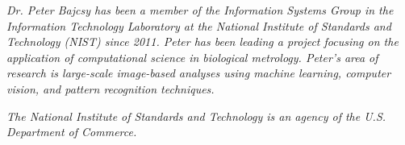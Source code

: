 \documentclass[10pt, indentfirst]{article}
\begin{document}
\noindent\textit{Dr. Peter Bajcsy has been a member of the Information Systems Group in the Information Technology Laboratory at the National Institute of Standards and Technology (NIST) since 2011.
	Peter has been leading a project focusing on the application of computational science in biological metrology.
	Peter’s area of research is large-scale image-based analyses using machine learning, computer vision, and pattern recognition techniques.}

\noindent\textit{The National Institute of Standards and Technology is an agency of the U.S. Department of Commerce.} \\
\end{document}
